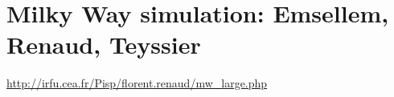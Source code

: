 \section{Milky Way simulation: Emsellem, Renaud, Teyssier}

\url{http://irfu.cea.fr/Pisp/florent.renaud/mw_large.php}